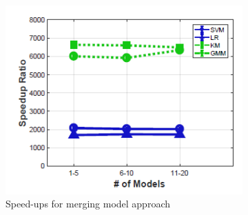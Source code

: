 \begin{figure}[h]
\captionsetup[subfigure]{width=1\textwidth}
     \centering
    \begin{subfigure}{0.2\textwidth}
        \includegraphics[height = 1.2\textwidth, width=1.2\textwidth]{Figures/model_reuse_merge_model_speed_up.png}
        \caption{Speed-ups for merging model approach}
        \label{fig:model_reuse1}
    \end{subfigure}
    \hfill
    \begin{subfigure}{0.2\textwidth}

\end{subfigure}
\end{figure}
